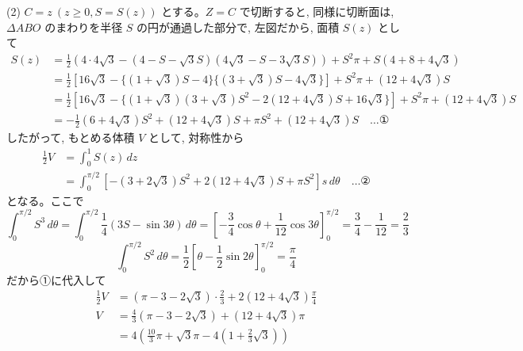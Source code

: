 \documentclass[../main.tex]{subfiles}
\begin{document}
\noindent
(2) $C = z \ (z \ge 0, S = S(z))$ とする。$Z = C$ で切断すると, 同様に切断面は, $\Delta ABO$ のまわりを半径 $S$ の円が通過した部分で, 左図だから, 面積 $S(z)$ として
\begin{align*}
  S(z) &= \frac{1}{2} \left(4\cdot 4\sqrt{3} - (4-S-\sqrt{3}S)(4\sqrt{3}-S-3\sqrt{3}S)\right) + S^2 \pi + S(4+8+4\sqrt{3}) \\
  &= \frac{1}{2} \left[ 16\sqrt{3} - \{(1+\sqrt{3})S - 4\}\{(3+\sqrt{3})S - 4\sqrt{3}\} \right] + S^2 \pi + (12+4\sqrt{3})S \\
  &= \frac{1}{2} \left[ 16\sqrt{3} - \{(1+\sqrt{3})(3+\sqrt{3})S^2 - 2(12+4\sqrt{3})S + 16\sqrt{3}\} \right] + S^2 \pi + (12+4\sqrt{3})S \\
  &= -\frac{1}{2} (6+4\sqrt{3}) S^2 + (12+4\sqrt{3}) S + \pi S^2 + (12+4\sqrt{3}) S \quad \dots \text{①}
\end{align*}
したがって, もとめる体積 $V$ として, 対称性から
\begin{align*}
  \frac{1}{2} V &= \int_0^1 S(z) \, dz \\
  &= \int_0^{\pi/2} \left[ -(3+2\sqrt{3}) S^2 + 2(12+4\sqrt{3}) S + \pi S^2 \right] s \, d\theta \quad \dots \text{②}
\end{align*}
となる。ここで
\[
  \int_0^{\pi/2} S^3 \, d\theta = \int_0^{\pi/2} \frac{1}{4} (3 S - \sin 3\theta) \, d\theta = \left[ -\frac{3}{4} \cos\theta + \frac{1}{12} \cos 3\theta \right]_0^{\pi/2} = \frac{3}{4} - \frac{1}{12} = \frac{2}{3}
\]
\[
  \int_0^{\pi/2} S^2 \, d\theta = \frac{1}{2} \left[ \theta - \frac{1}{2} \sin 2\theta \right]_0^{\pi/2} = \frac{\pi}{4}
\]
だから①に代入して
\begin{align*}
  \frac{1}{2} V &= (\pi - 3 - 2\sqrt{3}) \cdot \frac{2}{3} + 2(12+4\sqrt{3}) \frac{\pi}{4} \\
  V &= \frac{4}{3} (\pi - 3 - 2\sqrt{3}) + (12+4\sqrt{3}) \pi \\
  &= 4 \left( \frac{10}{3}\pi + \sqrt{3}\pi - 4\left(1 + \frac{2}{3}\sqrt{3}\right) \right)
\end{align*}
\end{document}
